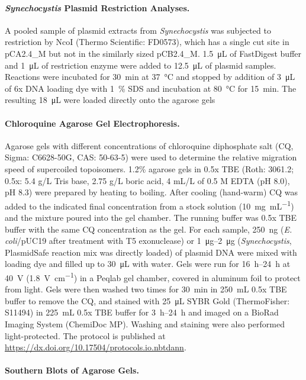 \documentclass[10pt,a4]{article}
\newcommand{\mL}{\milli\liter}
\newcommand{\scyst}{\textit{Synechocystis}}
\begin{document}
\paragraph{\scyst{} Plasmid Restriction Analyses.}
A pooled sample of plasmid extracts from \scyst{} was subjected to
restriction by NcoI (Thermo Scientific: FD0573), which has a single
cut site in pCA2.4\_M but not in the similarly sized pCB2.4\_M.
\SI{1.5}{\uL} of FastDigest buffer and \SI{1}{\uL} of restriction
enzyme were added to \SI{12.5}{\uL} of plasmid samples. Reactions were
incubated for \SI{30}{\minute} at \SI{37}{\celsius} and stopped by
addition of \SI{3}{\uL} of 6x DNA loading dye with \SI{1}{\percent}
SDS and incubation at \SI{80}{\celsius} for \SI{15}{\minute}. The
resulting \SI{18}{\uL} were loaded directly onto the agarose gels


\paragraph{Chloroquine Agarose Gel Electrophoresis.}
Agarose gels with different concentrations of chloroquine diphosphate
salt (CQ, Sigma: C6628-50G, CAS: 50-63-5) were used to determine the
relative migration speed of supercoiled topoisomers. 1.2\% agarose
gels in 0.5x TBE (Roth: 3061.2; 0.5x: 5.4 g/L Tris base, 2.75 g/L
boric acid, 4 mL/L of 0.5 M EDTA (pH 8.0), pH 8.3) were prepared by
heating to boiling. After cooling (hand-warm) CQ was added to the
indicated final concentration from a stock solution
(\SI{10}{\milli\gram\per\milli\liter}) and the mixture poured into the
gel chamber. The running buffer was 0.5x TBE buffer with the same CQ
concentration as the gel. For each sample, \SI{250}{\ng}
(\textit{E. coli}/pUC19 after treatment with T5 exonuclease) or
\SIrange{1}{2}{\ug} (\scyst{}, PlasmidSafe reaction mix was directly
loaded) of plasmid DNA were mixed with loading dye and filled up to
\SI{30}{\uL} with water.  Gels were run for \SIrange{16}{24}{\hour} at
\SI{40}{\volt} (\SI{1.8}{\volt\per\cm}) in a Peqlab gel chamber,
covered in aluminum foil to protect from light. Gels were then washed
two times for \SI{30}{\minute} in \SI{250}{\mL} 0.5x TBE buffer to
remove the CQ, and stained with \SI{25}{\uL} SYBR Gold (ThermoFisher:
S11494) in \SI{225}{\mL} 0.5x TBE buffer for \SIrange{3}{24}{\hour}
and imaged on a BioRad Imaging System (ChemiDoc MP). Washing and
staining were also performed light-protected.  The protocol is
published at \url{https://dx.doi.org/10.17504/protocols.io.nbtdann}.

\paragraph{Southern Blots of Agarose Gels.}
\end{document}
